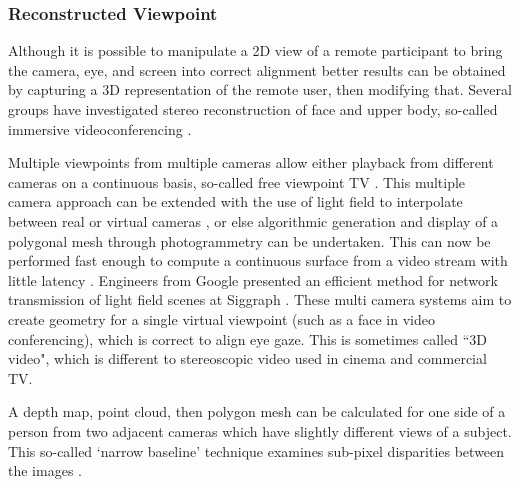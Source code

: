 \subsubsection{Reconstructed Viewpoint}
Although it is possible to manipulate a 2D view of a remote participant to bring the camera, eye, and screen into correct alignment better results can be obtained by capturing a 3D representation of the remote user, then modifying that. Several groups have investigated stereo reconstruction of face and upper body, so-called immersive videoconferencing \cite{Atzpadin2004}. \par                   Multiple viewpoints from multiple cameras allow either playback from different cameras on a continuous basis, so-called free viewpoint TV \cite{Zhang2007}. This multiple camera approach can be extended with the use of light field to interpolate between real or virtual cameras \cite{Ott1993, Al-Saidi2009}, or else algorithmic generation and display of a polygonal mesh through photogrammetry can be undertaken. This can now be performed fast enough to compute a continuous surface from a video stream with little latency \cite{Criminisi:2003ji}. 
Engineers from Google presented an efficient method for network transmission of light field scenes at Siggraph \cite{broxton2020immersive}.
These multi camera systems aim to create geometry for a single virtual viewpoint (such as a face in video conferencing), which is correct to align eye gaze. This is sometimes called ``3D video", which is different to stereoscopic video used in cinema and commercial TV.\par
 A depth map, point cloud, then polygon mesh can be calculated for one side of a person from two adjacent cameras which have slightly different views of a subject.  This so-called `narrow baseline' technique examines sub-pixel disparities between the images \cite{Knoblauch2008}. \par

